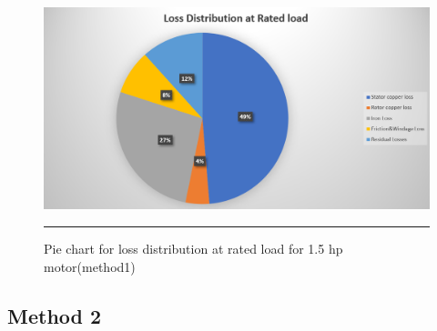 \begin{figure}[htbp]
	\centering
		\includegraphics[width = 4.5in]{./Figures/MS/fig518.png}
		\rule{35em}{0.5pt}
	\caption{Pie chart for loss distribution at rated load for 1.5 hp motor(method1)}
	\label{fig:Pie chart for loss distribution at rated load for 1.5 hp motor(method1)} 
\end{figure}

\subsection{Method 2}
